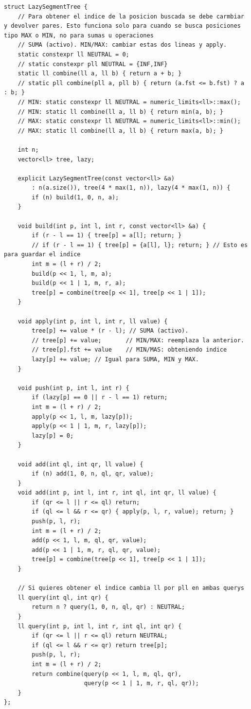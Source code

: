 \begin{lstlisting}[style=cpp]
struct LazySegmentTree {
    // Para obtener el indice de la posicion buscada se debe carmbiar y devolver pares. Esto funciona solo para cuando se busca posiciones tipo MAX o MIN, no para sumas u operaciones
    // SUMA (activo). MIN/MAX: cambiar estas dos lineas y apply.
    static constexpr ll NEUTRAL = 0;
    // static constexpr pll NEUTRAL = {INF,INF}
    static ll combine(ll a, ll b) { return a + b; }
    // static pll combine(pll a, pll b) { return (a.fst <= b.fst) ? a : b; }
    // MIN: static constexpr ll NEUTRAL = numeric_limits<ll>::max();
    // MIN: static ll combine(ll a, ll b) { return min(a, b); }
    // MAX: static constexpr ll NEUTRAL = numeric_limits<ll>::min();
    // MAX: static ll combine(ll a, ll b) { return max(a, b); }

    int n;
    vector<ll> tree, lazy;

    explicit LazySegmentTree(const vector<ll> &a)
        : n(a.size()), tree(4 * max(1, n)), lazy(4 * max(1, n)) {
        if (n) build(1, 0, n, a);
    }

    void build(int p, int l, int r, const vector<ll> &a) {
        if (r - l == 1) { tree[p] = a[l]; return; }
        // if (r - l == 1) { tree[p] = {a[l], l}; return; } // Esto es para guardar el indice
        int m = (l + r) / 2;
        build(p << 1, l, m, a);
        build(p << 1 | 1, m, r, a);
        tree[p] = combine(tree[p << 1], tree[p << 1 | 1]);
    }

    void apply(int p, int l, int r, ll value) {
        tree[p] += value * (r - l); // SUMA (activo).
        // tree[p] += value;       // MIN/MAX: reemplaza la anterior.
        // tree[p].fst += value    // MIN/MAS: obteniendo indice
        lazy[p] += value; // Igual para SUMA, MIN y MAX.
    }

    void push(int p, int l, int r) {
        if (lazy[p] == 0 || r - l == 1) return;
        int m = (l + r) / 2;
        apply(p << 1, l, m, lazy[p]);
        apply(p << 1 | 1, m, r, lazy[p]);
        lazy[p] = 0;
    }

    void add(int ql, int qr, ll value) {
        if (n) add(1, 0, n, ql, qr, value);
    }
    void add(int p, int l, int r, int ql, int qr, ll value) {
        if (qr <= l || r <= ql) return;
        if (ql <= l && r <= qr) { apply(p, l, r, value); return; }
        push(p, l, r);
        int m = (l + r) / 2;
        add(p << 1, l, m, ql, qr, value);
        add(p << 1 | 1, m, r, ql, qr, value);
        tree[p] = combine(tree[p << 1], tree[p << 1 | 1]);
    }

    // Si quieres obtener el indice cambia ll por pll en ambas querys
    ll query(int ql, int qr) {
        return n ? query(1, 0, n, ql, qr) : NEUTRAL;
    }
    ll query(int p, int l, int r, int ql, int qr) {
        if (qr <= l || r <= ql) return NEUTRAL;
        if (ql <= l && r <= qr) return tree[p];
        push(p, l, r);
        int m = (l + r) / 2;
        return combine(query(p << 1, l, m, ql, qr),
                       query(p << 1 | 1, m, r, ql, qr));
    }
};
\end{lstlisting}

